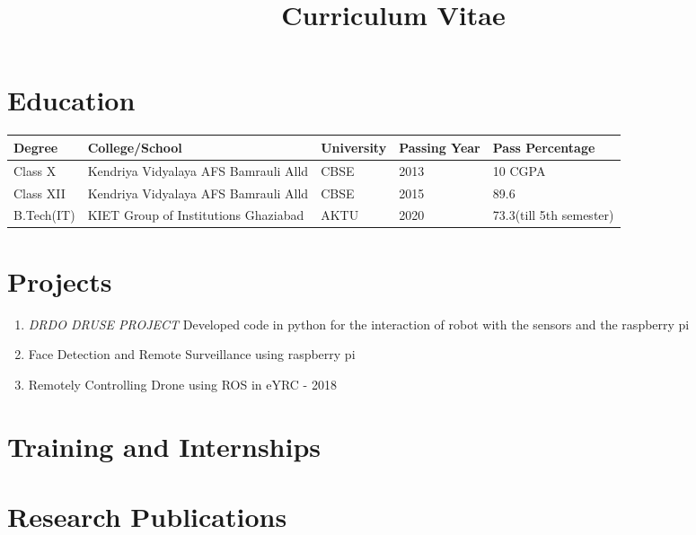 \documentclass[11pt,a4paper,sans]{moderncv} %
\title{Curriculum Vitae}
\begin{document}

\makecvtitle %


\section{Education}










\setlength{\arrayrulewidth}{1mm}
\setlength{\tabcolsep}{18pt}
\renewcommand{\arraystretch}{1.5}
\hspace*{-2.5cm}
\begin{tabular}{ |p{3cm}|p{3cm}|p{3cm}|p{3cm}|p{2cm}|  }
		
		
		\hline
		Degree & College/School & University & Passing Year & Pass Percentage \\
		\hline
		Class X & Kendriya Vidyalaya AFS Bamrauli Alld & CBSE & 2013 & 10 CGPA \\
		Class XII & Kendriya Vidyalaya AFS Bamrauli Alld   & CBSE & 2015 & 89.6\\
		B.Tech(IT) & KIET Group of Institutions Ghaziabad & AKTU & 2020 & 73.3(till 5th semester)\\
		
		\hline
\end{tabular}

\section{Projects}
\begin{enumerate}
	\item \textit{DRDO DRUSE PROJECT} {Developed code in python for the interaction of robot with the sensors and the raspberry pi}
	\newline{}
	\item Face Detection and Remote Surveillance using raspberry pi
	\newline{}
	\item Remotely Controlling Drone using ROS in eYRC - 2018
\end{enumerate}




\section{Training and Internships}

\section{Research Publications}

	
	
	
\end{document}
